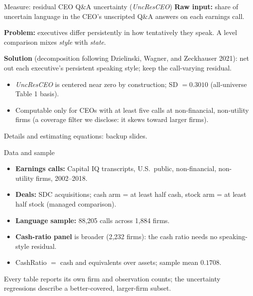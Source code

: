 \documentclass[aspectratio=169, 11pt]{beamer}
\begin{document}
\begin{frame}{Measure: residual CEO Q\&A uncertainty (\textit{UncResCEO})}
  \textbf{Raw input:} share of uncertain language in the CEO's unscripted
  Q\&A answers on each earnings call.
  \vspace{0.4em}

  \textbf{Problem:} executives differ persistently in how tentatively they speak.
  A level comparison mixes \emph{style} with \emph{state}.
  \vspace{0.4em}

  \textbf{Solution} (decomposition following Dzielinski, Wagner, and Zeckhauser 2021):
  net out each executive's persistent speaking style; keep the
  \alert{call-varying residual}.
  \begin{itemize}
    \item \textit{UncResCEO} is centered near zero by construction;
      SD $= 0.3010$ (all-universe Table 1 basis).
    \item Computable only for CEOs with at least five calls at non-financial,
      non-utility firms (a coverage filter we disclose: it skews toward larger firms).
  \end{itemize}
  \vspace{0.3em}
  {\small\color{mutedgray} Details and estimating equations: backup slides.}
\end{frame}

\begin{frame}{Data and sample}
  \begin{itemize}
    \item \textbf{Earnings calls:} Capital IQ transcripts, U.S.\ public,
      non-financial, non-utility firms, 2002--2018.
    \item \textbf{Deals:} SDC acquisitions; cash arm = at least half cash,
      stock arm = at least half stock (managed comparison).
    \item \textbf{Language sample:} 88{,}205 calls across 1{,}884 firms.
    \item \textbf{Cash-ratio panel} is broader (2{,}232 firms): the cash ratio
      needs no speaking-style residual.
    \item CashRatio $=$ cash and equivalents over assets; sample mean $0.1708$.
  \end{itemize}
  \vspace{0.5em}
  {\small\color{mutedgray} Every table reports its own firm and observation
  counts; the uncertainty regressions describe a better-covered,
  larger-firm subset.}
\end{frame}
\end{document}
